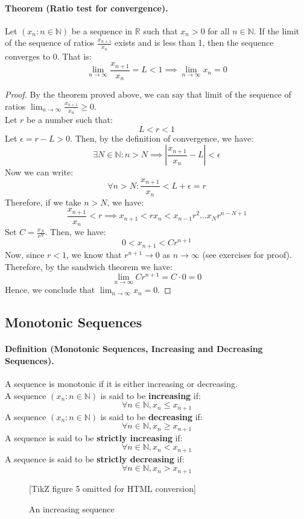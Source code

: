 \documentclass[openany]{book}
\numberwithin{equation}{section}
\begin{document}
\paragraph{Theorem (Ratio test for convergence).}

    Let $(x_n : n \in \mathbb{N})$ be a sequence in $\mathbb{R}$ such that $x_n > 0$ for all $n \in \mathbb{N}$. If the limit of the sequence of ratios $\frac{x_{n+1}}{x_n}$ exists and is less than 1, then the sequence converges to 0. That is:
    $$\lim_{n \to \infty} \frac{x_{n+1}}{x_n} = L < 1 \implies \lim_{n \to \infty} x_n = 0$$
\par
\begin{proof}
    By the theorem proved above, we can say that limit of the sequence of ratios $\lim_{n \to \infty} \frac{x_{n+1}}{x_n} \geq 0$. \\
    Let $r$ be a number such that: $$L < r < 1$$
    Let $\epsilon = r-L > 0$. Then, by the definition of convergence, we have:
    $$\exists N \in \mathbb{N}: n > N \implies \left|\frac{x_{n+1}}{x_n} - L\right| < \epsilon$$
    Now we can write:
    $$\forall n > N: \frac{x_{n+1}}{x_n} < L + \epsilon = r$$
    Therefore, if we take $n > N$, we have:
    $$\frac{x_{n+1}}{x_n} < r \implies x_{n+1} < r x_n < x_{n-1}r^2 ... x_N r^{n - N +1}$$
    Set $C = \frac{x_N}{r^N}$. Then, we have:
    $$0< x_{n+1} < C r^{n+1}$$
    Now, since $r < 1$, we know that $r^{n+1} \rightarrow 0$ as $n \rightarrow \infty$ (see exercises for proof). Therefore, by the sandwich theorem we have:
    $$\lim_{n \to \infty} C r^{n+1} = C \cdot 0 = 0$$
    Hence, we conclude that $\lim_{n \to \infty} x_n = 0$. 
\end{proof}
\subsection{Monotonic Sequences}
\paragraph{Definition (Monotonic Sequences, Increasing and Decreasing Sequences).}

    A sequence is monotonic if it is either increasing or decreasing. \\
    A sequence $(x_n : n \in \mathbb{N})$ is said to be \textbf{increasing} if:
    $$\forall n \in \mathbb{N}, x_n \leq x_{n+1}$$
    A sequence $(x_n : n \in \mathbb{N})$ is said to be \textbf{decreasing} if:
    $$\forall n \in \mathbb{N}, x_n \geq x_{n+1}$$
    A sequence is said to be \textbf{strictly increasing} if:
    $$\forall n \in \mathbb{N}, x_n < x_{n+1}$$
    A sequence is said to be \textbf{strictly decreasing} if:
    $$\forall n \in \mathbb{N}, x_n > x_{n+1}$$ 
\par
\begin{figure}[H]
    \centering
    

[TikZ figure 5 omitted for HTML conversion]

    \caption{An increasing sequence}
    \label{fig:increasing_sequence}
\end{figure}
\end{document}
